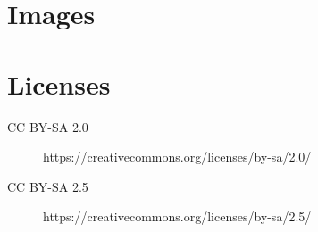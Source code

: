 \documentclass[parskip=half,final,oneside,a4paper]{scrartcl}
\def\imagecopyrights{}
\begin{document}












  \section{Images}
  \begin{enumerate}
    \imagecopyrights
  \end{enumerate}

  \section{Licenses}

  \begin{description}
    \item[CC BY-SA 2.0] https://creativecommons.org/licenses/by-sa/2.0/
    \item[CC BY-SA 2.5] https://creativecommons.org/licenses/by-sa/2.5/
  \end{description}
\end{document}
